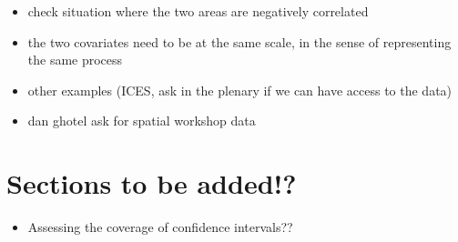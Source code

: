 \documentclass[
]{book}
\providecommand{\tightlist}{%
  \setlength{\itemsep}{0pt}\setlength{\parskip}{0pt}}
\begin{document}
\begin{itemize}
\tightlist
\item
  check situation where the two areas are negatively correlated
\item
  the two covariates need to be at the same scale, in the sense of representing the same process
\item
  other examples (ICES, ask in the plenary if we can have access to the data)
\item
  dan ghotel ask for spatial workshop data
\end{itemize}

\hypertarget{sections-to-be-added}{%
\chapter{Sections to be added!?}\label{sections-to-be-added}}

\begin{itemize}
\tightlist
\item
  Assessing the coverage of confidence intervals??
\end{itemize}
\end{document}
